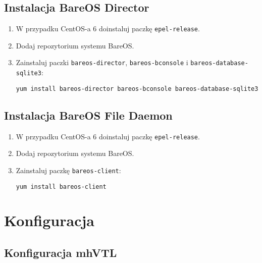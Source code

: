 \documentclass[polish]{article}
\begin{document}
\subsection*{Instalacja BareOS Director}

\begin{enumerate}

\item W przypadku CentOS-a 6 doinstaluj paczkę \texttt{epel-release}.

\item Dodaj repozytorium systemu BareOS.

\item Zainstaluj paczki \texttt{bareos-director}, \texttt{bareos-bconsole} i \texttt{bareos-database-sqlite3}:
\begin{verbatim}
yum install bareos-director bareos-bconsole bareos-database-sqlite3
\end{verbatim}

\end{enumerate}


\subsection*{Instalacja BareOS File Daemon}

\begin{enumerate}

\item W przypadku CentOS-a 6 doinstaluj paczkę \texttt{epel-release}.

\item Dodaj repozytorium systemu BareOS.

\item Zainstaluj paczkę \texttt{bareos-client}:
\begin{verbatim}
yum install bareos-client
\end{verbatim}

\end{enumerate}


\section{Konfiguracja}


\subsection*{Konfiguracja mhVTL}
\end{document}
